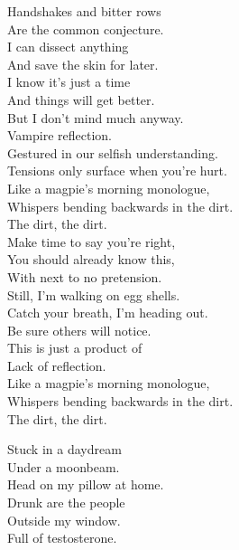 


Handshakes and bitter rows \\
Are the common conjecture. \\
I can dissect anything \\
And save the skin for later. \\

I know it's just a time \\
And things will get better. \\
But I don't mind much anyway. \\
Vampire reflection. \\

Gestured in our selfish understanding. \\
Tensions only surface when you're hurt. \\
Like a magpie's morning monologue, \\
Whispers bending backwards in the dirt. \\
The dirt, the dirt. \\

Make time to say you're right, \\
You should already know this, \\
With next to no pretension. \\
Still, I'm walking on egg shells. \\

Catch your breath, I'm heading out. \\
Be sure others will notice. \\
This is just a product of \\
Lack of reflection. \\

Like a magpie's morning monologue, \\
Whispers bending backwards in the dirt. \\
The dirt, the dirt. \\




Stuck in a daydream \\
Under a moonbeam. \\
Head on my pillow at home. \\
Drunk are the people \\
Outside my window. \\
Full of testosterone. \\

